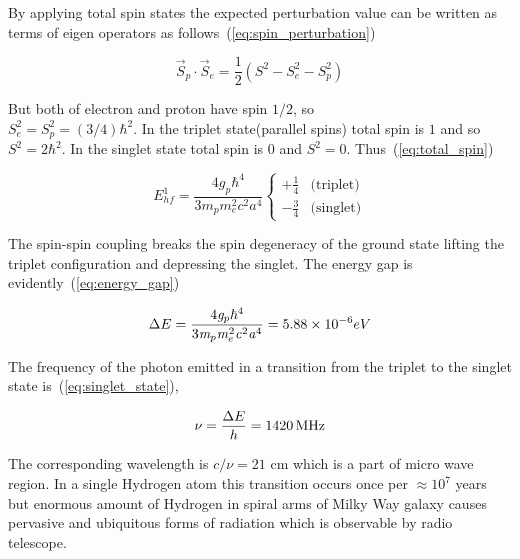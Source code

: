 \documentclass[10pt,conference]{IEEEtran}
\begin{document}
By applying total spin states the expected perturbation value can be written as terms of eigen operators as follows~(\ref{eq:spin_perturbation})

\begin{equation}
  \vec{S}_{p}\cdot\vec{S}_{e}=\frac{1}{2}(\mathit{S}^{2}-\mathit{S}_{e}^{2}-\mathit{S}_{p}^{2})
  \label{eq:spin_perturbation}
 \end{equation}
 
But both of electron and proton have spin $1/2$, so\\ $\mathit{S}_{e}^{2}=\mathit{S}_{p}^{2}=(3/4)\mathit{\hbar}^{2}$. In the triplet state(parallel spins) total spin is $1$ and so $\mathit{S}^{2}=2\mathit{\hbar}^{2}$. In the singlet state total spin is $0$ and $\mathit{S}^{2}=0$. Thus~(\ref{eq:total_spin})

\begin{equation}
\label{eq:total_spin}
 \mathit{E}_{hf}^{1}=\frac{4\mathit{g}_{p}\mathit{\hbar}^{4}}{3\mathit{m}_{p}\mathit{m}_{e}^{2}\mathit{c}^{2}\mathit{a}^{4}}\begin{cases}
 +\frac{1}{4}& \text{(triplet)}\\
 -\frac{3}{4}& \text{(singlet)}
\end{cases} 
\end{equation}

The spin-spin coupling breaks the spin degeneracy of the ground state lifting the triplet configuration and depressing the singlet. The energy gap is evidently~(\ref{eq:energy_gap})

\begin{equation}
 \Delta\-E=\frac{4\mathit{g}_{p}\mathit{\hbar}^{4}}{3\mathit{m}_{p}\mathit{m}_{e}^{2}\mathit{c}^{2}\mathit{a}^{4}}=5.88\times10^{-6} eV
 \label{eq:energy_gap}
\end{equation}


The frequency of the photon emitted in a transition from the triplet to the singlet state is~(\ref{eq:singlet_state}),

\begin{equation}
 \mathit{\nu}=\frac{\Delta\-E}{h}=\SI{1420}{MHz}
 \label{eq:singlet_state}
\end{equation}

The corresponding wavelength is $c/\nu=21$ cm which is a part of micro wave region\cite{griffiths2016introduction,santo2013mapping}. In a single Hydrogen atom this transition occurs once per $\approx10^{7}$ years but enormous amount of Hydrogen in spiral arms of Milky Way galaxy causes pervasive and ubiquitous forms of radiation which is observable by radio telescope\cite{santo2013mapping}.
\end{document}

